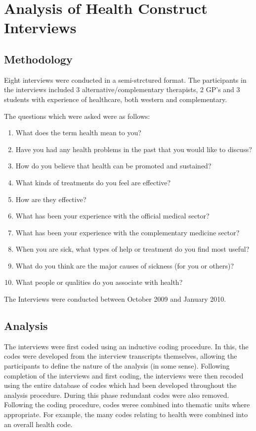 
\section{Analysis of Health Construct Interviews}

\subsection{Methodology}

Eight interviews were conducted in a semi-strctured format. The participants in the interviews included 3 alternative/complementary therapists, 2 GP's and 3 students with experience of healthcare, both western and complementary.

The questions which were asked were as follows:
\begin{enumerate}
\item What does the term health mean to you? 
\item Have you had any health problems in the past that you would like to discuss?
\item How do you believe that health can be promoted and sustained?
\item What kinds of treatments do you feel are effective? 
\item How are they effective?
\item What has been your experience with the official medical sector?
\item What has been your experience with the complementary medicine sector?
\item When you are sick, what types of help or treatment do you find most useful?
\item What do you think are the major causes of sickness (for you or others)?
\item What people or qualities do you associate with health?
\end{enumerate}


The Interviews were conducted between October 2009 and January 2010. 

\subsection{Analysis}

The interviews were first coded using an inductive coding procedure. In this, the codes were developed from the interview transcripts themselves, allowing the participants to define the nature of the analysis (in some sense). Following completion of the interviews and first coding, the interviews were then recoded using the entire database of codes which had been developed throughout the analysis procedure.
During this phase redundant codes were also removed. Following the coding procedure, codes weree combined into thematic units where appropriate. For example, the many codes relating to health were combined into an overall health code.

